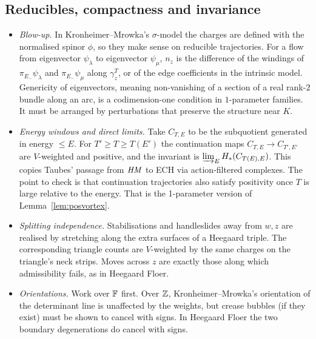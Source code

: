 \subsection{Reducibles, compactness and invariance}\label{subsec:inv}
\begin{itemize}[leftmargin=2em]
\item \emph{Blow-up.}  In Kronheimer--Mrowka's $\sigma$-model the charges are defined with the normalised spinor $\phi$, so they
make sense on reducible trajectories.  For a flow from eigenvector $\psi_\lambda$ to eigenvector $\psi_\mu$, $n_z$ is the difference of the
windings of $\pi_{E_-}\psi_\lambda$ and $\pi_{E_-}\psi_\mu$ along $\gamma_z^T$, or of the edge coefficients in the intrinsic model.  Genericity of
eigenvectors, meaning non-vanishing of a section of a real rank-$2$ bundle along an arc, is a codimension-one condition
in $1$-parameter families.  It must be arranged by perturbations that preserve the structure near $K$.
\item \emph{Energy windows and direct limits.}  Take $C_{T,E}$ to be the subquotient generated in energy $\le E$.  For
$T'\ge T\ge T(E')$ the continuation maps $C_{T,E}\to C_{T',E'}$ are $V$-weighted and positive, and the invariant is
$\varinjlim_E H_*(C_{T(E),E})$.  This copies Taubes' passage from $\mathit{HM}$ to ECH via action-filtered complexes.  The point to
check is that continuation trajectories also satisfy positivity once $T$ is large relative to the energy.  That is the
1-parameter version of Lemma~\ref{lem:posvortex}.
\item \emph{Splitting independence.}  Stabilisations and handleslides away from $w,z$ are realised by stretching along
the extra surfaces of a Heegaard triple.  The corresponding triangle counts are $V$-weighted by the same charges on the
triangle's neck strips.  Moves across $z$ are exactly those along which admissibility fails, as in Heegaard Floer.
\item \emph{Orientations.}  Work over $\mathbb{F}$ first.  Over $\mathbb{Z}$, Kronheimer--Mrowka's orientation of the determinant line is
unaffected by the weights, but crease bubbles (if they exist) must be shown to cancel with signs.  In Heegaard Floer
the two boundary degenerations do cancel with signs.
\end{itemize}
